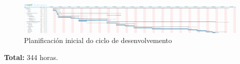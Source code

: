  \begin{figure}[htbp]
  \centering
  \includegraphics[trim=0 0 112cm 0,clip=true,scale=0.70,keepaspectratio=true]{./imagenes/desenvolvemento.png}
  \caption{Planificación inicial do ciclo de desenvolvemento}
  \label{figura:PlanificacionInicialDesenvolvemento}
 \end{figure}

 \textbf{Total:} 344 horas.

